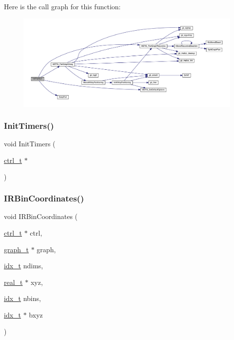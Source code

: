 Here is the call graph for this function\+:\nopagebreak
\begin{figure}[H]
\begin{center}
\leavevmode
\includegraphics[width=350pt]{a00951_a5358042c354702d9e8128f7cc342a322_cgraph}
\end{center}
\end{figure}
\mbox{\label{a00951_a0c897af52fe5815caadbe6a13f2f9f54}} 
\subsubsection{\texorpdfstring{Init\+Timers()}{InitTimers()}}
{\footnotesize\ttfamily void Init\+Timers (\begin{DoxyParamCaption}\item[{\hyperlink{a00742}{ctrl\+\_\+t} $\ast$}]{ }\end{DoxyParamCaption})}

\mbox{\label{a00951_a868c9811f572c62917c5e8cc22dd92a9}} 
\subsubsection{\texorpdfstring{I\+R\+Bin\+Coordinates()}{IRBinCoordinates()}}
{\footnotesize\ttfamily void I\+R\+Bin\+Coordinates (\begin{DoxyParamCaption}\item[{\hyperlink{a00742}{ctrl\+\_\+t} $\ast$}]{ctrl,  }\item[{\hyperlink{a00734}{graph\+\_\+t} $\ast$}]{graph,  }\item[{\hyperlink{a00876_aaa5262be3e700770163401acb0150f52}{idx\+\_\+t}}]{ndims,  }\item[{\hyperlink{a00876_a1924a4f6907cc3833213aba1f07fcbe9}{real\+\_\+t} $\ast$}]{xyz,  }\item[{\hyperlink{a00876_aaa5262be3e700770163401acb0150f52}{idx\+\_\+t}}]{nbins,  }\item[{\hyperlink{a00876_aaa5262be3e700770163401acb0150f52}{idx\+\_\+t} $\ast$}]{bxyz }\end{DoxyParamCaption})}

